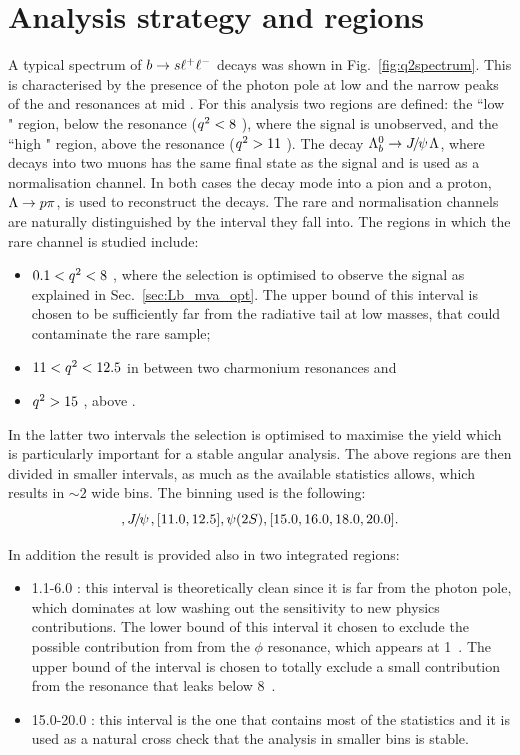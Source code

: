 \section{Analysis strategy and \qsq regions}
\label{sec:Lb_q2choice}

A typical \qsq spectrum of ${b}\rightarrow{\ensuremath{s}}\ell^+ \ell^-$ decays was shown in Fig.~\ref{fig:q2spectrum}.
This is characterised by the presence of the photon pole at low \qsq and the narrow peaks of the \jpsi and \psitwos resonances at mid \qsq.
For this analysis two regions are defined: the ``low \qsq" region, below the \jpsi resonance (${q^2} < 8$ \gevgevcccc),
where the signal is unobserved, and the ``high \qsq" region, above the \jpsi resonance (${q^2} > 11$ \gevgevcccc).
The decay $\Lb\to\jpsi\Lz$, where \jpsi decays into two muons has the same final state as the signal and
is used as a normalisation channel.
In both cases the \Lz decay mode into a pion and a proton, $\Lz\to p\pi$,
is used to reconstruct the decays. The rare and normalisation channels are naturally distinguished
by the \qsq interval they fall into. The regions in which the rare channel is studied include:
\begin{itemize}
\item $0.1 < {q^2} < 8$ \gevgevcccc, where the selection is optimised to observe the signal as explained in Sec.~\ref{sec:Lb_mva_opt}.
The upper bound of this interval is chosen to be sufficiently far from the \jpsi radiative tail at low masses, that
could contaminate the rare sample;
\item $11 < {q^2} < 12.5$ \gevgevcccc in between two charmonium resonances and 
\item ${q^2}>15$ \gevgevcccc, above \psitwos.
\end{itemize}
In the latter two intervals the selection is optimised to maximise the yield which is particularly important
for a stable angular analysis. The above regions are then divided in smaller intervals, as much as the available 
statistics allows, which results in $\sim 2$ \gevgevcccc wide bins. The binning used is the following:
\begin{equation}
[0.1, 2.0, 4.0, 6.0, 8.0], \jpsi, [11.0, 12.5], \psitwos, [15.0, 16.0, 18.0, 20.0].
\end{equation}

In addition the result is provided also in two integrated regions:
\begin{itemize}
\item 1.1-6.0 \gevgevcccc: this interval is theoretically clean since it is far from the
photon pole, which dominates at low \qsq washing out the sensitivity to new physics contributions.
The lower bound of this interval it chosen to exclude the possible contribution from
from the $\phi$ resonance, which appears at 1~\gevgevcccc. The upper bound of the interval
is chosen to totally exclude a small contribution from the \jpsi resonance that leaks
below 8~\gevgevcccc.
\item 15.0-20.0 \gevgevcccc: this interval is the one that contains most of the
statistics and it is used as a natural cross check that the analysis in smaller bins is stable.
\end{itemize}

